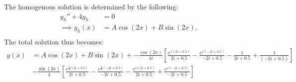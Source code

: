 \documentclass{article}
\begin{document}
The homogenous solution is determined by the following:
\begin{align*}
    y_h'' + 4y_h &= 0\\
    \implies y_h(x) &= A\cos(2x) + B\sin(2x),\\
\end{align*}The total solution thus becomes:
\begin{align*}
    y(x) &= A\cos(2x) + B\sin(2x) + -\frac{\cos(2x)}{4i}\left[\frac{e^{x(2i + 0.5)}}{2i + 0.5} - \frac{e^{x(-2i+0.5)}}{-2i + 0.5} - \frac{1}{2i + 0.5} + \frac{1}{(-2i + 0.5)}\right]\\
    &-\frac{\sin(2x)}{4}\left[\frac{e^{\frac{\pi}{4}(2i + 0.5)}}{2i + 0.5} - \frac{e^{\frac{\pi}{4}(-2i + 0.5)}}{-2i + 0.5} - \frac{e^{x(2i + 0.5)}}{2i + 0.5} + \frac{e^{x(-2i + 0.5)}}{-2i + 0.5}\right] 
\end{align*}
\end{document}
